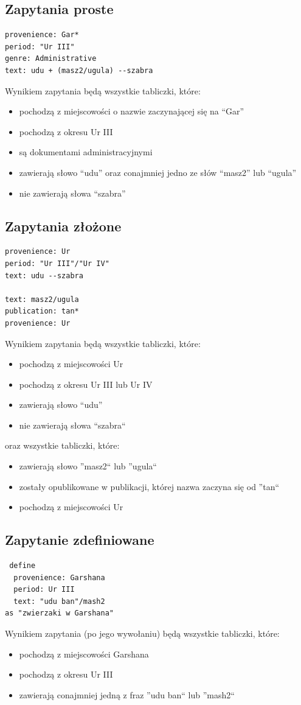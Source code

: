 \documentclass{pracamgr}
\begin{document}
\subsection{Zapytania proste}
\begin{verbatim}
provenience: Gar*
period: "Ur III"
genre: Administrative
text: udu + (masz2/ugula) --szabra
\end{verbatim}
Wynikiem zapytania będą wszystkie tabliczki, które:
\begin{itemize}
 \item pochodzą z miejscowości o nazwie zaczynającej się na ``Gar''
\item pochodzą z okresu Ur III
\item są dokumentami administracyjnymi
\item zawierają słowo ``udu'' oraz conajmniej jedno ze słów ``masz2'' lub ``ugula''
\item nie zawierają słowa ``szabra''
\end{itemize}


\subsection{Zapytania złożone}
\begin{verbatim}
provenience: Ur
period: "Ur III"/"Ur IV"
text: udu --szabra

text: masz2/ugula
publication: tan*
provenience: Ur
\end{verbatim}
Wynikiem zapytania będą wszystkie tabliczki, które:
\begin{itemize}
 \item pochodzą z miejscowości Ur
 \item pochodzą z okresu Ur III lub Ur IV
 \item zawierają słowo ``udu''
 \item nie zawierają słowa ``szabra``
\end{itemize}
oraz wszystkie tabliczki, które:
\begin{itemize}
 \item zawierają słowo ''masz2`` lub ''ugula``
 \item zostały opublikowane w publikacji, której nazwa zaczyna się od ''tan``
 \item pochodzą z miejscowości Ur
\end{itemize}


\subsection{Zapytanie zdefiniowane}
\begin{verbatim}
 define
  provenience: Garshana
  period: Ur III
  text: "udu ban"/mash2
as "zwierzaki w Garshana"
\end{verbatim}
Wynikiem zapytania (po jego wywołaniu) będą wszystkie tabliczki, które:
\begin{itemize}
\item pochodzą z miejscowości Garshana
\item pochodzą z okresu Ur III
\item zawierają conajmniej jedną z fraz ''udu ban`` lub ''mash2``
\end{itemize}
\end{document}
